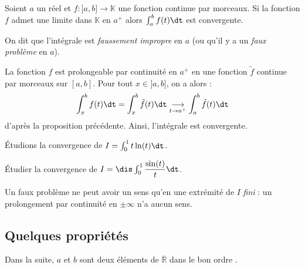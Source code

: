 \documentclass[a4paper,10pt]{report}
\begin{document}
\begin{prop} Soient $a$ un réel et $f : ]a,b] \rightarrow \mathbb{K}$ une fonction continue par morceaux. Si la fonction $f$ admet une limite dans $\mathbb{K}$ en $a^{+}$ alors $\int_{a}^b f(t) \dt$ est convergente.


\medskip

\noindent On dit que l'intégrale est \textit{faussement impropre} en $a$ (ou qu'il y a un \textit{faux problème} en $a$).
\end{prop}

\newpage

\begin{preuve} La fonction $f$ est prolongeable par continuité en $a^+$ en une fonction $\tilde{f}$ continue par morceaux sur $[a,b]$. Pour tout $x \in ]a,b]$, on a alors :
$$ \int_{x}^b f(t) \dt = \int_{x}^b \tilde{f}(t) \dt \underset{t \rightarrow a^+}{\longrightarrow} \int_{a}^b \tilde{f}(t) \dt$$
d'après la proposition précédente. Ainsi, l'intégrale est convergente.
\end{preuve}

\medskip

\begin{ex} Étudions la convergence de $I = \int_{0}^1 t \ln(t) \dt$.

\medskip


\vspace{3cm}
\end{ex}

\begin{exa} Étudier la convergence de $I = \dis \int_{0}^{1} \dfrac{\sin(t)}{t} \dt$.
\end{exa}

\begin{att} Un faux problème ne peut avoir un sens qu'en une extrémité de $I$ \textit{fini} : un prolongement par continuité en $ \pm \infty$ n'a aucun sens.
\end{att}


\subsection{Quelques propriétés}
\noindent Dans la suite, $a$ et $b$ sont deux éléments de $\overline{\mathbb{R}}$ dans \og le bon ordre \fg .
\end{document}
